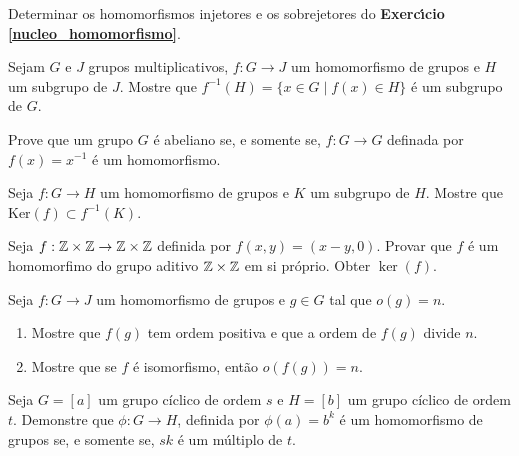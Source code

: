 \documentclass[12pt]{exam}
\begin{document}
    \vspace{.3cm}

    \questao{} Determinar os homomorfismos injetores e os sobrejetores do \textbf{Exerc{\'\i}cio \ref{nucleo_homomorfismo}}.

    \vspace{.3cm}

    \questao{} Sejam $G$ e $J$ grupos multiplicativos, $f : G \to J$ um homomorfismo de grupos e $H$ um subgrupo de $J$. Mostre que $f^{-1}(H) = \{ x \in G \mid f(x) \in H\}$ {\'e} um subgrupo de $G$.

    \vspace{.3cm}

    \questao{} Prove que um grupo $G$ {\'e} abeliano se, e somente se, $f : G \to G$ definada por $f(x) = x^{-1}$ {\'e} um homomorfismo.

    \vspace{.3cm}

    \questao{} Seja $f: G\to H$ um homomorfismo de grupos e $K$ um subgrupo de $H$. Mostre que Ker$(f)\subset f^{-1}(K)$.

    \vspace{.3cm}

    \questao{} Seja $f: \mathbb{Z} \times \mathbb{Z} \to \mathbb{Z} \times \mathbb{Z}$ definida por $f(x, y) = (x - y, 0)$. Provar que $f$ \'e um homomorfimo do grupo aditivo $\mathbb{Z} \times \mathbb{Z}$ em si pr\'oprio. Obter $\ker(f)$.

    \vspace{.3cm}

    \questao{} Seja $f: G \to J$ um homomorfismo de grupos e $g\in G$ tal que $o(g)=n$.
    \begin{enumerate}[label=({\alph*})]
      \item Mostre que $f(g)$ tem ordem positiva e que a ordem de $f(g)$ divide $n$.
      
      \item Mostre que se $f$ {\'e} isomorfismo, ent{\~a}o $o(f(g))=n$.
    \end{enumerate}

    \vspace{.3cm}

    \questao{} Seja $G = [a]$ um grupo cíclico de ordem $s$ e $H = [b]$ um grupo cíclico de ordem $t$. Demonstre que $\phi : G \to H$, definida por $\phi(a) = b^k$ é um homomorfismo de grupos se, e somente se, $sk$ é um múltiplo de $t$.
\end{document}
